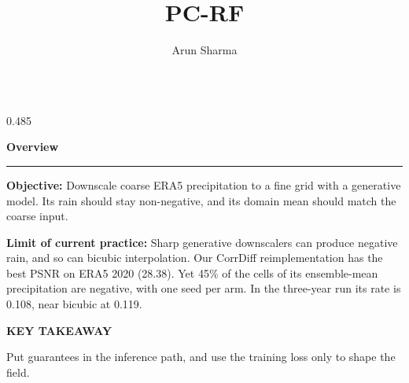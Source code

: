 \documentclass{beamer}
\title{PC-RF}
\author{Arun Sharma}
\newenvironment{possection}[2]{%
  \par\vspace{0.10cm}%
  \noindent{\color{pcbluedark}\bfseries\large #1}\hspace{0.42em}%
  {\color{ncink}\bfseries\large #2}\par\vspace{-0.20cm}%
  \noindent\textcolor{ncline}{\rule{\linewidth}{0.9pt}}\par\vspace{0cm}%
  \begin{minipage}{\linewidth}%
}{%
  \end{minipage}\par\vspace{0.40cm}%
}
\newcommand{\heil}[1]{{\color{ncink}\bfseries #1:}\hspace{0.3em}}
\newcommand{\tklabel}[1]{{\ttfamily\footnotesize\bfseries\color{pcbluedark}\MakeUppercase{#1}}\par\vspace{0.14cm}}
\begin{document}
\begin{frame}[t]
\vspace{0.42cm}
\begin{columns}[t,onlytextwidth]

\begin{column}{0.485\textwidth}

  \begin{possection}{1.}{Overview}
    \heil{Objective} Downscale coarse ERA5 precipitation to a fine grid with a
    generative model. Its rain should stay non-negative, and its domain mean should
    match the coarse input.
    \par\vspace{0.14cm}
    \heil{Limit of current practice} Sharp generative downscalers can produce
    negative rain, and so can bicubic interpolation. Our CorrDiff reimplementation
    has the best PSNR on ERA5 2020 (28.38). Yet 45\% of the cells of its
    ensemble-mean precipitation are negative, with one seed per arm. In the three-year
    run its rate is 0.108, near bicubic at 0.119.
    \par\vspace{0.18cm}
    \begin{takeaway}
      \tklabel{Key takeaway}
      {\color{ncink}\normalsize Put guarantees in the inference path, and use the
      training loss only to shape the field.}
    \end{takeaway}
  \end{possection}


\end{column}
\end{columns}
\end{frame}
\end{document}
